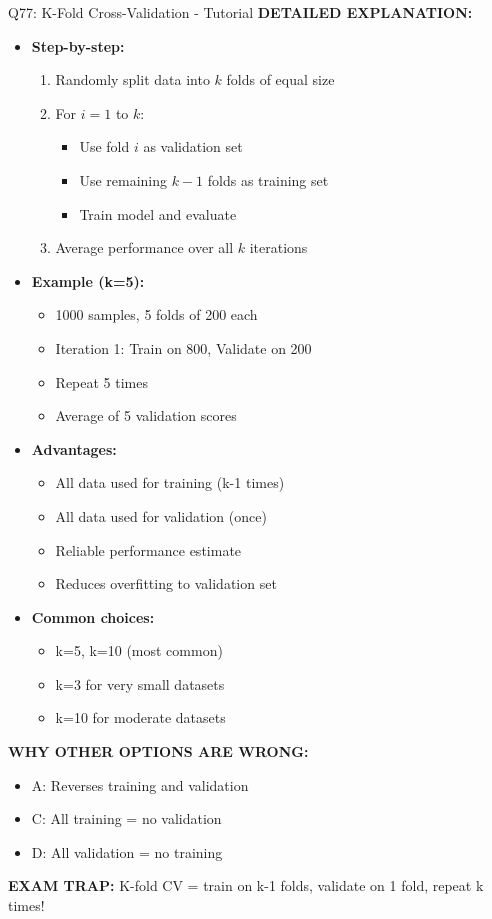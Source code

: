 \documentclass[8pt]{beamer}
\begin{document}
\begin{frame}{Q77: K-Fold Cross-Validation - Tutorial}
		\vspace{0.05cm}
		\textbf{DETAILED EXPLANATION:}
		\begin{itemize}
			\item \textbf{Step-by-step:}
			\begin{enumerate}
				\item Randomly split data into $k$ folds of equal size
				\item For $i = 1$ to $k$:
				\begin{itemize}
					\item Use fold $i$ as validation set
					\item Use remaining $k-1$ folds as training set
					\item Train model and evaluate
				\end{itemize}
				\item Average performance over all $k$ iterations
			\end{enumerate}
			\item \textbf{Example (k=5):}
			\begin{itemize}
				\item 1000 samples, 5 folds of 200 each
				\item Iteration 1: Train on 800, Validate on 200
				\item Repeat 5 times
				\item Average of 5 validation scores
			\end{itemize}
			\item \textbf{Advantages:}
			\begin{itemize}
				\item All data used for training (k-1 times)
				\item All data used for validation (once)
				\item Reliable performance estimate
				\item Reduces overfitting to validation set
			\end{itemize}
			\item \textbf{Common choices:}
			\begin{itemize}
				\item k=5, k=10 (most common)
				\item k=3 for very small datasets
				\item k=10 for moderate datasets
			\end{itemize}
		\end{itemize}
		
		\vspace{0.05cm}
		\textcolor{myred}{\textbf{WHY OTHER OPTIONS ARE WRONG:}}
		\begin{itemize}
			\item \textcolor{myred}{A:} Reverses training and validation
			\item \textcolor{myred}{C:} All training = no validation
			\item \textcolor{myred}{D:} All validation = no training
		\end{itemize}
		
		\textcolor{myred}{\textbf{EXAM TRAP:}} K-fold CV = train on k-1 folds, validate on 1 fold, repeat k times!
	\end{frame}
	
\end{document}
